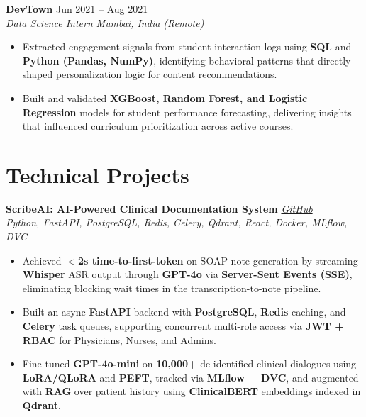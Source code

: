\documentclass[letterpaper,10pt]{article}
\newcommand{\resumeSubheading}[4]{%
  \vspace{2pt}%
  \textbf{#1} \hfill {#2} \\[-1pt]
  \textit{#3} \hfill \textit{#4}%
  \vspace{1pt}%
}
\newcommand{\resumeProject}[3]{%
  \vspace{2pt}%
  \textbf{#1} \hfill \href{#3}{\textit{GitHub}} \\[-1pt]
  \textit{#2}%
  \vspace{1pt}%
}
\begin{document}
\vspace{2pt}

\resumeSubheading
  {DevTown}{Jun 2021 -- Aug 2021}
  {Data Science Intern}{Mumbai, India (Remote)}
\begin{itemize}
  \item Extracted engagement signals from student interaction logs using \textbf{SQL} and \textbf{Python (Pandas, NumPy)}, identifying behavioral patterns that directly shaped personalization logic for content recommendations.
  \item Built and validated \textbf{XGBoost, Random Forest, and Logistic Regression} models for student performance forecasting, delivering insights that influenced curriculum prioritization across active courses.
\end{itemize}

\section{Technical Projects}

\resumeProject
  {ScribeAI: AI-Powered Clinical Documentation System}
  {Python, FastAPI, PostgreSQL, Redis, Celery, Qdrant, React, Docker, MLflow, DVC}
  {https://github.com/sushildalavi/ScribeAI}
\begin{itemize}
  \item Achieved \textbf{$<$2s time-to-first-token} on SOAP note generation by streaming \textbf{Whisper} ASR output through \textbf{GPT-4o} via \textbf{Server-Sent Events (SSE)}, eliminating blocking wait times in the transcription-to-note pipeline.
  \item Built an async \textbf{FastAPI} backend with \textbf{PostgreSQL}, \textbf{Redis} caching, and \textbf{Celery} task queues, supporting concurrent multi-role access via \textbf{JWT + RBAC} for Physicians, Nurses, and Admins.
  \item Fine-tuned \textbf{GPT-4o-mini} on \textbf{10,000+} de-identified clinical dialogues using \textbf{LoRA/QLoRA} and \textbf{PEFT}, tracked via \textbf{MLflow + DVC}, and augmented with \textbf{RAG} over patient history using \textbf{ClinicalBERT} embeddings indexed in \textbf{Qdrant}.
\end{itemize}

\vspace{2pt}
\end{document}
